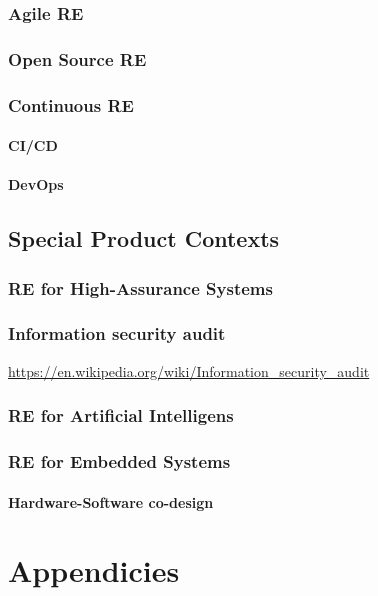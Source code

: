 \documentclass{reqengbook}
\begin{document}
\section{Agile RE}

\section{Open Source RE}

\section{Continuous RE}

\subsection{CI/CD}
\subsection{DevOps}

\chapter{Special Product Contexts}

\section{RE for High-Assurance Systems}
\section{Information security audit}
\url{https://en.wikipedia.org/wiki/Information_security_audit}

\section{RE for Artificial Intelligens}

\section{RE for Embedded Systems}
\subsection{Hardware-Software co-design}

\part{Appendicies}\appendix
\end{document}
